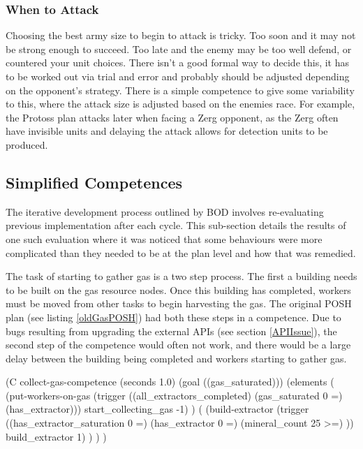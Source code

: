 \documentclass[11pt,openright,a4paper]{report}
\begin{document}
\subsubsection{When to Attack}
Choosing the best army size to begin to attack is tricky. Too soon and it may not be strong enough to succeed. Too late and the enemy may be too well defend, or countered your unit choices. There isn't a good formal way to decide this, it has to be worked out via trial and error and probably should be adjusted depending on the opponent's strategy. There is a simple competence to give some variability to this, where the attack size is adjusted based on the enemies race. For example, the Protoss plan attacks later when facing a Zerg opponent, as the Zerg often have invisible units and delaying the attack allows for detection units to be produced.


\subsection{Simplified Competences}
The iterative development process outlined by BOD involves re-evaluating previous implementation after each cycle. This sub-section details the results of one such evaluation where it was noticed that some behaviours were more complicated than they needed to be at the plan level and how that was remedied.

The task of starting to gather gas is a two step process. The first a building needs to be built on the gas resource nodes. Once this building has completed, workers must be moved from other tasks to begin harvesting the gas. The original POSH plan (see listing \ref{oldGasPOSH}) had both these steps in a competence. Due to bugs resulting from upgrading the external APIs (see section \ref{APIIssue}), the second step of the competence would often not work, and there would be a large delay between the building being completed and workers starting to gather gas.

\begin{Code}[frame=single,language=Lisp,tabsize=4,breaklines,breakatwhitespace,caption={The original POSH competence to manage collecting gas},label=oldGasPOSH]
	(C collect-gas-competence (seconds 1.0) (goal ((gas_saturated)))
		(elements
			(
				(put-workers-on-gas (trigger ((all_extractors_completed)
					(gas_saturated 0 =)
					(has_extractor))) start_collecting_gas -1)
			)
			(
				(build-extractor (trigger ((has_extractor_saturation 0 =)
					(has_extractor 0 =)
					(mineral_count 25 >=)
					)) build_extractor 1)
			)
		)
	)
\end{Code}
\end{document}
